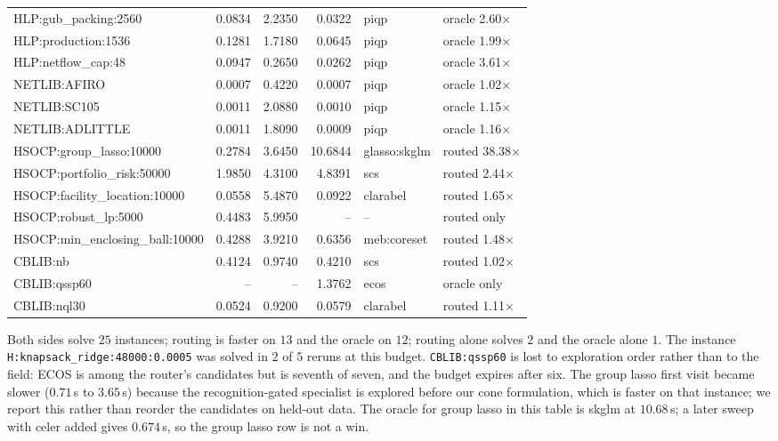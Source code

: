 \documentclass[11pt]{article}
\begin{document}
\begin{center}
\begin{tabular}{lrrrll}
HLP:gub\_packing:2560 & 0.0834 & 2.2350 & 0.0322 & piqp & oracle 2.60$\times$ \\
HLP:production:1536 & 0.1281 & 1.7180 & 0.0645 & piqp & oracle 1.99$\times$ \\
HLP:netflow\_cap:48 & 0.0947 & 0.2650 & 0.0262 & piqp & oracle 3.61$\times$ \\
NETLIB:AFIRO & 0.0007 & 0.4220 & 0.0007 & piqp & oracle 1.02$\times$ \\
NETLIB:SC105 & 0.0011 & 2.0880 & 0.0010 & piqp & oracle 1.15$\times$ \\
NETLIB:ADLITTLE & 0.0011 & 1.8090 & 0.0009 & piqp & oracle 1.16$\times$ \\
HSOCP:group\_lasso:10000 & 0.2784 & 3.6450 & 10.6844 & glasso:skglm & routed 38.38$\times$ \\
HSOCP:portfolio\_risk:50000 & 1.9850 & 4.3100 & 4.8391 & scs & routed 2.44$\times$ \\
HSOCP:facility\_location:10000 & 0.0558 & 5.4870 & 0.0922 & clarabel & routed 1.65$\times$ \\
HSOCP:robust\_lp:5000 & 0.4483 & 5.9950 & -- & -- & routed only \\
HSOCP:min\_enclosing\_ball:10000 & 0.4288 & 3.9210 & 0.6356 & meb:coreset & routed 1.48$\times$ \\
CBLIB:nb & 0.4124 & 0.9740 & 0.4210 & scs & routed 1.02$\times$ \\
CBLIB:qssp60 & -- & -- & 1.3762 & ecos & oracle only \\
CBLIB:nql30 & 0.0524 & 0.9200 & 0.0579 & clarabel & routed 1.11$\times$ \\
\bottomrule
\end{tabular}
\end{center}

Both sides solve $25$ instances; routing is faster on $13$ and the oracle on
$12$; routing alone solves $2$ and the oracle alone $1$. The instance
\texttt{H:knapsack\_ridge:48000:0.0005} was solved in $2$ of $5$ reruns at this
budget. \texttt{CBLIB:qssp60} is lost to exploration order rather than to the
field: ECOS is among the router's candidates but is seventh of seven, and the
budget expires after six. The group lasso first visit became slower
($0.71$\,s to $3.65$\,s) because the recognition-gated specialist is explored
before our cone formulation, which is faster on that instance; we report this
rather than reorder the candidates on held-out data. The oracle for group lasso
in this table is skglm at $10.68$\,s; a later sweep with celer added gives
$0.674$\,s, so the group lasso row is not a win.
\end{document}
